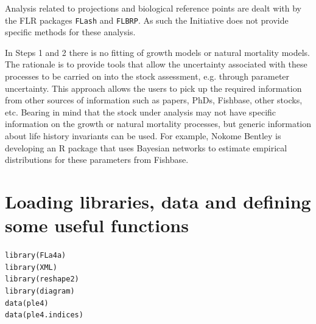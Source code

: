 \documentclass[a4paper,english,10pt]{article}\usepackage[]{graphicx}\usepackage[]{color}
\makeatletter
\newcommand{\hlstd}[1]{\textcolor[rgb]{0,0,0}{#1}}%
\newcommand{\hlkwd}[1]{\textcolor[rgb]{0.361,0.506,0.596}{#1}}%
\newenvironment{kframe}{%
 \def\at@end@of@kframe{}%
 \ifinner\ifhmode%
  \def\at@end@of@kframe{\end{minipage}}%
  \begin{minipage}{\columnwidth}%
 \fi\fi%
 \def\FrameCommand##1{\hskip\@totalleftmargin \hskip-\fboxsep
 \colorbox{shadecolor}{##1}\hskip-\fboxsep
     \hskip-\linewidth \hskip-\@totalleftmargin \hskip\columnwidth}%
 \MakeFramed {\advance\hsize-\width
   \@totalleftmargin\z@ \linewidth\hsize
   \@setminipage}}%
 {\par\unskip\endMakeFramed%
 \at@end@of@kframe}
\newenvironment{knitrout}{}{} %
\newcommand{\pkg}[1]{{\texttt{#1}}}
\makeatother
\begin{document}
Analysis related to projections and biological reference points are dealt with by the FLR packages \pkg{FLash} and \pkg{FLBRP}. As such the Initiative does not provide specific methods for these analysis.

In Steps 1 and 2 there is no fitting of growth models or natural mortality models. The rationale is to provide tools that allow the uncertainty associated with these processes to be carried on into the stock assessment, e.g. through parameter uncertainty. This approach allows the users to pick up the required information from other sources of information such as papers, PhDs, Fishbase, other stocks, etc. Bearing in mind that the stock under analysis may not have specific information on the growth or natural mortality processes, but generic information about life history invariants can be used. For example, Nokome Bentley is developing an R package that uses Bayesian networks to estimate empirical distributions for these parameters from Fishbase.

\section{Loading libraries, data and defining some useful functions}




\begin{knitrout}
\color{fgcolor}\begin{kframe}
\begin{alltt}
\hlkwd{library}\hlstd{(FLa4a)}
\hlkwd{library}\hlstd{(XML)}
\hlkwd{library}\hlstd{(reshape2)}
\hlkwd{library}\hlstd{(diagram)}
\hlkwd{data}\hlstd{(ple4)}
\hlkwd{data}\hlstd{(ple4.indices)}
\end{alltt}
\end{kframe}
\end{knitrout}
\end{document}
